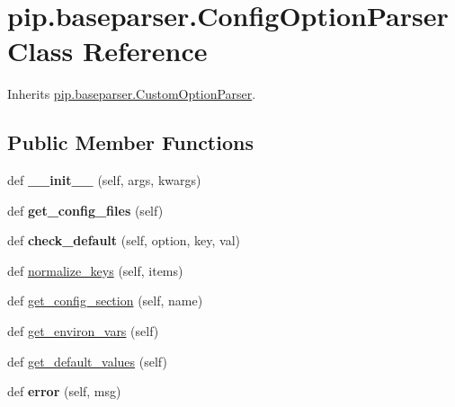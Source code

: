 \hypertarget{classpip_1_1baseparser_1_1_config_option_parser}{}\section{pip.\+baseparser.\+Config\+Option\+Parser Class Reference}
\label{classpip_1_1baseparser_1_1_config_option_parser}


Inherits \hyperlink{classpip_1_1baseparser_1_1_custom_option_parser}{pip.\+baseparser.\+Custom\+Option\+Parser}.

\subsection*{Public Member Functions}
\begin{DoxyCompactItemize}
\item 
\mbox{\label{classpip_1_1baseparser_1_1_config_option_parser_a13d9f22982d31a7c2834ea0103350cb8}} 
def {\bfseries \+\_\+\+\_\+init\+\_\+\+\_\+} (self, args, kwargs)
\item 
\mbox{\label{classpip_1_1baseparser_1_1_config_option_parser_a8fc07caba31d4a62c8b7eba0eaafbe9b}} 
def {\bfseries get\+\_\+config\+\_\+files} (self)
\item 
\mbox{\label{classpip_1_1baseparser_1_1_config_option_parser_a28a88e73f4195ba1647e231e36b1b7f1}} 
def {\bfseries check\+\_\+default} (self, option, key, val)
\item 
def \hyperlink{classpip_1_1baseparser_1_1_config_option_parser_a69d71a377015a9faa50da36fef01d313}{normalize\+\_\+keys} (self, items)
\item 
def \hyperlink{classpip_1_1baseparser_1_1_config_option_parser_a833df2251c0c281cc1edede5a2421b8b}{get\+\_\+config\+\_\+section} (self, name)
\item 
def \hyperlink{classpip_1_1baseparser_1_1_config_option_parser_a7c9d3c7d370dfbcf198e412678a07a5f}{get\+\_\+environ\+\_\+vars} (self)
\item 
def \hyperlink{classpip_1_1baseparser_1_1_config_option_parser_a376557439a966569d80a173ebd2aaccd}{get\+\_\+default\+\_\+values} (self)
\item 
\mbox{\label{classpip_1_1baseparser_1_1_config_option_parser_a74c009037085c3cacad996b4613dec1c}} 
def {\bfseries error} (self, msg)
\end{DoxyCompactItemize}
